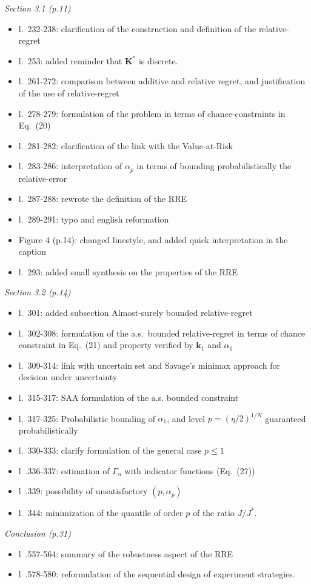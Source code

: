 \documentclass[a4paper,11pt]{article}
\begin{document}
\emph{Section 3.1 (p.11)}
\begin{itemize}
\item l.~232-238: clarification of the construction and definition of the relative-regret 
\item l.~253: added reminder that $\mathbf{K}^*$ is discrete.
\item l.~261-272: comparison between additive and relative regret, and justification of the use of relative-regret
\item l.~278-279: formulation of the problem in terms of chance-constraints in Eq.~(20)
\item l.~281-282: clarification of the link with the Value-at-Risk 
\item l.~283-286: interpretation of $\alpha_p$ in terms of bounding probabilistically the relative-error
\item l.~287-288: rewrote the definition of the RRE
\item l.~289-291: typo and english reformation
\item Figure 4 (p.14): changed linestyle, and added quick interpretation in the caption 
\item l.~293: added small synthesis on the properties of the RRE
\end{itemize}
\emph{Section 3.2 (p.14)}
  \begin{itemize}
\item l.~301: added subsection Almost-surely bounded relative-regret
\item l.~302-308: formulation of the a.s.\ bounded relative-regret in terms of chance constraint in Eq.~(21) and property verified by $\mathbf{k}_1$ and $\alpha_1$
\item l.~309-314: link with uncertain set and Savage's minimax approach for decision under uncertainty
\item l.~315-317: SAA formulation of the a.s. bounded constraint
\item l.~317-325: Probabilistic bounding of $\alpha_1$, and level $p=(\eta/2)^{1/N}$ guaranteed probabilistically
\item l.~330-333: clarify formulation of the general case $p \leq 1$
\item l~.336-337: estimation of $\Gamma_\alpha$ with indicator functions (Eq.~(27))
\item l~.339: possibility of unsatisfactory $(p, \alpha_p)$
\item l.~344: minimization of the quantile of order $p$ of the ratio $J / J^*$.
\end{itemize}
 \emph{Conclusion (p.31)}
\begin{itemize}
\item l~.557-564: summary of the robustness aspect of the RRE
\item l~.578-580: reformulation of the sequential design of experiment strategies.
\end{itemize}
\end{document}
